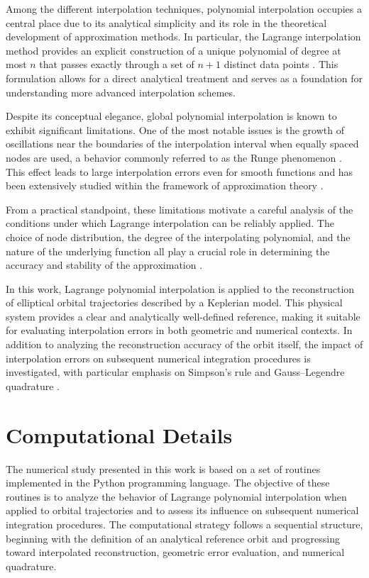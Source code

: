 \documentclass[reprint,amsmath,amssymb,aps]{revtex4-2}
\begin{document}
	Among the different interpolation techniques, polynomial interpolation occupies a central place due to its analytical simplicity and its role in the theoretical development of approximation methods. In particular, the Lagrange interpolation method provides an explicit construction of a unique polynomial of degree at most $n$ that passes exactly through a set of $n+1$ distinct data points \cite{BurdenFaires}. This formulation allows for a direct analytical treatment and serves as a foundation for understanding more advanced interpolation schemes.
	
	Despite its conceptual elegance, global polynomial interpolation is known to exhibit significant limitations. One of the most notable issues is the growth of oscillations near the boundaries of the interpolation interval when equally spaced nodes are used, a behavior commonly referred to as the Runge phenomenon \cite{Runge1901}. This effect leads to large interpolation errors even for smooth functions and has been extensively studied within the framework of approximation theory \cite{Trefethen2013}.
	
	From a practical standpoint, these limitations motivate a careful analysis of the conditions under which Lagrange interpolation can be reliably applied. The choice of node distribution, the degree of the interpolating polynomial, and the nature of the underlying function all play a crucial role in determining the accuracy and stability of the approximation \cite{Atkinson,Trefethen2013}.
	
	In this work, Lagrange polynomial interpolation is applied to the reconstruction of elliptical orbital trajectories described by a Keplerian model. This physical system provides a clear and analytically well-defined reference, making it suitable for evaluating interpolation errors in both geometric and numerical contexts. In addition to analyzing the reconstruction accuracy of the orbit itself, the impact of interpolation errors on subsequent numerical integration procedures is investigated, with particular emphasis on Simpson's rule and Gauss--Legendre quadrature \cite{NumericalRecipes}.
	
	
	\section{Computational Details}
	
	The numerical study presented in this work is based on a set of routines implemented in the Python programming language. The objective of these routines is to analyze the behavior of Lagrange polynomial interpolation when applied to orbital trajectories and to assess its influence on subsequent numerical integration procedures. The computational strategy follows a sequential structure, beginning with the definition of an analytical reference orbit and progressing toward interpolated reconstruction, geometric error evaluation, and numerical quadrature.
	
\end{document}
